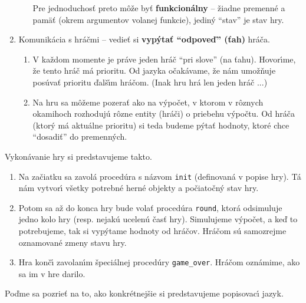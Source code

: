 \documentclass[a4paper,12pt]{article}
\begin{document}
\begin{enumerate}
\begin{enumerate}
        Pre jednoduchos\v{t} preto m\^{o}\v{z}e by\v{t} \textbf{funkcion\'{a}lny}
        -- \v{z}iadne premenn\'{e} a pam\"{a}\v{t} (okrem argumentov volanej
        funkcie), jedin\'{y} ``stav'' je stav hry.
    \end{enumerate}
    \item Komunik\'{a}cia s hr\'{a}\v{c}mi -- vedie\v{t} si \textbf{vyp\'{y}ta\v{t}
    ``odpove\v{d}'' (\v{t}ah)} hr\'{a}\v{c}a.
    \begin{enumerate}
        \item V ka\v{z}dom momente je pr\'{a}ve jeden hr\'{a}\v{c} ``pri slove''
        (na \v{t}ahu). Hovor\'{\i}me, \v{z}e tento hr\'{a}\v{c} m\'{a}
        prioritu. Od jazyka o\v{c}ak\'{a}vame, \v{z}e n\'{a}m umo\v{z}\v{n}uje
        pos\'{u}va\v{t} prioritu \v{d}al\v{s}\'{\i}m hr\'{a}\v{c}om.
        (Inak hru hr\'{a} len jeden hr\'{a}\v{c} ...)
        \item Na hru sa m\^{o}\v{z}eme pozera\v{t} ako na v\'{y}po\v{c}et, v ktorom
        v r\^{o}znych okamihoch rozhoduj\'{u} r\^{o}zne entity (hr\'{a}\v{c}i)
        o priebehu v\'{y}po\v{c}tu. Od hr\'{a}\v{c}a (ktor\'{y} m\'{a}
        aktu\'{a}lne prioritu) si teda budeme p\'{y}ta\v{t} hodnoty,
        ktor\'{e} chce ``dosadi\v{t}'' do premenn\'{y}ch.
    \end{enumerate}
\end{enumerate}

Vykon\'{a}vanie hry si predstavujeme takto.

\begin{enumerate}
    \item Na za\v{c}iatku sa zavol\'{a} proced\'{u}ra s n\'{a}zvom \verb|init|
    (definovan\'{a} v popise hry).
    T\'{a} n\'{a}m vytvor\'{\i} v\v{s}etky potrebn\'{e} hern\'{e}
    objekty a po\v{c}iato\v{c}n\'{y} stav hry.
    \item Potom sa a\v{z} do konca hry bude vola\v{t} proced\'{u}ra
    \verb|round|, ktor\'{a} odsimuluje jedno kolo hry (resp. nejak\'{u}
    ucelen\'{u} \v{c}as\v{t} hry). Simulujeme v\'{y}po\v{c}et,
    a ke\v{d} to potrebujeme, tak si vyp\'{y}tame hodnoty od
    hr\'{a}\v{c}ov. Hr\'{a}\v{c}om s\'{u} samozrejme oznamovan\'{e}
    zmeny stavu hry.
    \item Hra kon\v{c}\'{\i} zavolan\'{\i}m
    \v{s}peci\'{a}lnej proced\'{u}ry \verb|game_over|. Hr\'{a}\v{c}om
    ozn\'{a}mime, ako sa im v hre darilo.
\end{enumerate}

Po\v{d}me sa pozrie\v{t} na to, ako konkr\'{e}tnej\v{s}ie
si predstavujeme popisovac\'{\i} jazyk.
\end{document}
